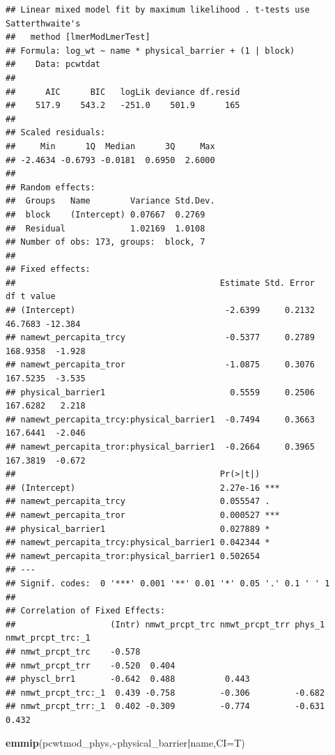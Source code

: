 \documentclass[
]{article}
\newenvironment{Shaded}{\begin{snugshade}}{\end{snugshade}}
\newcommand{\AttributeTok}[1]{\textcolor[rgb]{0.13,0.29,0.53}{#1}}
\newcommand{\FunctionTok}[1]{\textcolor[rgb]{0.13,0.29,0.53}{\textbf{#1}}}
\newcommand{\NormalTok}[1]{#1}
\newcommand{\SpecialCharTok}[1]{\textcolor[rgb]{0.81,0.36,0.00}{\textbf{#1}}}
\begin{document}
\begin{verbatim}
## Linear mixed model fit by maximum likelihood . t-tests use Satterthwaite's
##   method [lmerModLmerTest]
## Formula: log_wt ~ name * physical_barrier + (1 | block)
##    Data: pcwtdat
## 
##      AIC      BIC   logLik deviance df.resid 
##    517.9    543.2   -251.0    501.9      165 
## 
## Scaled residuals: 
##     Min      1Q  Median      3Q     Max 
## -2.4634 -0.6793 -0.0181  0.6950  2.6000 
## 
## Random effects:
##  Groups   Name        Variance Std.Dev.
##  block    (Intercept) 0.07667  0.2769  
##  Residual             1.02169  1.0108  
## Number of obs: 173, groups:  block, 7
## 
## Fixed effects:
##                                         Estimate Std. Error       df t value
## (Intercept)                              -2.6399     0.2132  46.7683 -12.384
## namewt_percapita_trcy                    -0.5377     0.2789 168.9358  -1.928
## namewt_percapita_tror                    -1.0875     0.3076 167.5235  -3.535
## physical_barrier1                         0.5559     0.2506 167.6282   2.218
## namewt_percapita_trcy:physical_barrier1  -0.7494     0.3663 167.6441  -2.046
## namewt_percapita_tror:physical_barrier1  -0.2664     0.3965 167.3819  -0.672
##                                         Pr(>|t|)    
## (Intercept)                             2.27e-16 ***
## namewt_percapita_trcy                   0.055547 .  
## namewt_percapita_tror                   0.000527 ***
## physical_barrier1                       0.027889 *  
## namewt_percapita_trcy:physical_barrier1 0.042344 *  
## namewt_percapita_tror:physical_barrier1 0.502654    
## ---
## Signif. codes:  0 '***' 0.001 '**' 0.01 '*' 0.05 '.' 0.1 ' ' 1
## 
## Correlation of Fixed Effects:
##                   (Intr) nmwt_prcpt_trc nmwt_prcpt_trr phys_1 nmwt_prcpt_trc:_1
## nmwt_prcpt_trc    -0.578                                                       
## nmwt_prcpt_trr    -0.520  0.404                                                
## physcl_brr1       -0.642  0.488          0.443                                 
## nmwt_prcpt_trc:_1  0.439 -0.758         -0.306         -0.682                  
## nmwt_prcpt_trr:_1  0.402 -0.309         -0.774         -0.631  0.432
\end{verbatim}

\begin{Shaded}
\begin{Highlighting}[]
\FunctionTok{emmip}\NormalTok{(pcwtmod\_phys,}\SpecialCharTok{\textasciitilde{}}\NormalTok{physical\_barrier}\SpecialCharTok{|}\NormalTok{name,}\AttributeTok{CI=}\NormalTok{T)}
\end{Highlighting}
\end{Shaded}
\end{document}
